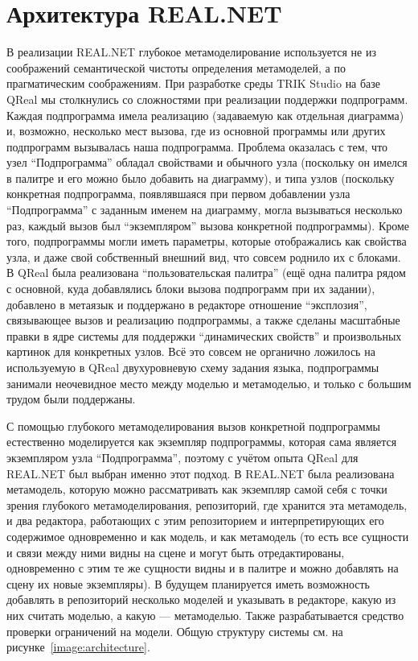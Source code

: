 \documentclass{spisok-article}
\begin{document}
\section{Архитектура REAL.NET}
В реализации REAL.NET глубокое метамоделирование используется не из соображений семантической чистоты определения метамоделей, а по прагматическим соображениям. При разработке среды TRIK Studio на базе QReal мы столкнулись со сложностями при реализации поддержки подпрограмм. Каждая подпрограмма имела реализацию (задаваемую как отдельная диаграмма) и, возможно, несколько мест вызова, где из основной программы или других подпрограмм вызывалась наша подпрограмма. Проблема оказалась с тем, что узел ``Подпрограмма'' обладал свойствами и обычного узла (поскольку он имелся в палитре и его можно было добавить на диаграмму), и типа узлов (поскольку конкретная подпрограмма, появлявшаяся при первом добавлении узла ``Подпрограмма'' с заданным именем на диаграмму, могла вызываться несколько раз, каждый вызов был ``экземпляром'' вызова конкретной подпрограммы). Кроме того, подпрограммы могли иметь параметры, которые отображались как свойства узла, и даже свой собственный внешний вид, что совсем роднило их с блоками. В QReal была реализована ``пользовательская палитра'' (ещё одна палитра рядом с основной, куда добавлялись блоки вызова подпрограмм при их задании), добавлено в метаязык и поддержано в редакторе отношение ``эксплозия'', связывающее вызов и реализацию подпрограммы, а также сделаны масштабные правки в ядре системы для поддержки ``динамических свойств'' и произвольных картинок для конкретных узлов. Всё это совсем не органично ложилось на используемую в QReal двухуровневую схему задания языка, подпрограммы занимали неочевидное место между моделью и метамоделью, и только с большим трудом были поддержаны.

С помощью глубокого метамоделирования вызов конкретной подпрограммы естественно моделируется как экземпляр подпрограммы, которая сама является экземпляром узла ``Подпрограмма'', поэтому с учётом опыта QReal для REAL.NET был выбран именно этот подход. В REAL.NET была реализована метамодель, которую можно рассматривать как экземпляр самой себя с точки зрения глубокого метамоделирования, репозиторий, где хранится эта метамодель, и два редактора, работающих с этим репозиторием и интерпретирующих его содержимое одновременно и как модель, и как метамодель (то есть все сущности и связи между ними видны на сцене и могут быть отредактированы, одновременно с этим те же сущности видны и в палитре и можно добавлять на сцену их новые экземпляры). В будущем планируется иметь возможность добавлять в репозиторий несколько моделей и указывать в редакторе, какую из них считать моделью, а какую --- метамоделью. Также разрабатывается средство проверки ограничений на модели. Общую структуру системы см. на рисунке~\ref{image:architecture}.
\end{document}
